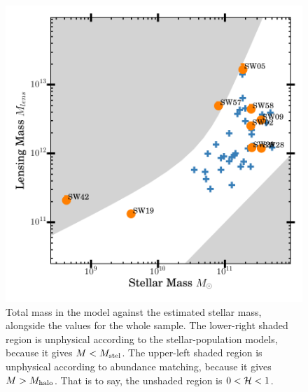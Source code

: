 \begin{figure}
\includegraphics[width=\linewidth]{img/mlens_vs_mstel_one/mstel_vs_mtot_one}
\caption{Total mass in the model against the estimated stellar mass,
  alongside the values for the whole sample.  The lower-right shaded
  region is unphysical according to the stellar-population models,
  because it gives $M<M_\text{stel}$. The upper-left shaded region is
  unphysical according to abundance matching, because it gives
  $M>M_\text{halo}$.  That is to say, the unshaded region is
  $0<\mathcal{H}<1$. \label{fig:stelmass}}
\end{figure}

